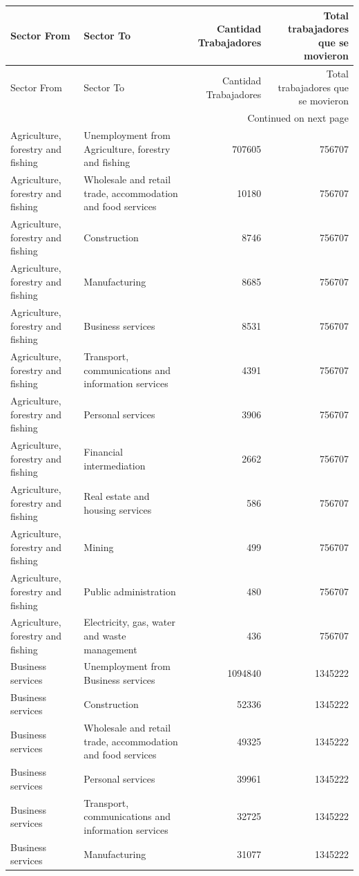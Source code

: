 \begin{longtable}{llrr}
\toprule
Sector From & Sector To & Cantidad Trabajadores & Total trabajadores que se movieron \\
\midrule
\endfirsthead
\toprule
Sector From & Sector To & Cantidad Trabajadores & Total trabajadores que se movieron \\
\midrule
\endhead
\midrule
\multicolumn{4}{r}{Continued on next page} \\
\midrule
\endfoot
\bottomrule
\endlastfoot
Agriculture, forestry and fishing & Unemployment from Agriculture, forestry and fishing & 707605 & 756707 \\
Agriculture, forestry and fishing & Wholesale and retail trade, accommodation and food services & 10180 & 756707 \\
Agriculture, forestry and fishing & Construction & 8746 & 756707 \\
Agriculture, forestry and fishing & Manufacturing & 8685 & 756707 \\
Agriculture, forestry and fishing & Business services & 8531 & 756707 \\
Agriculture, forestry and fishing & Transport, communications and information services & 4391 & 756707 \\
Agriculture, forestry and fishing & Personal services & 3906 & 756707 \\
Agriculture, forestry and fishing & Financial intermediation & 2662 & 756707 \\
Agriculture, forestry and fishing & Real estate and housing services & 586 & 756707 \\
Agriculture, forestry and fishing & Mining & 499 & 756707 \\
Agriculture, forestry and fishing & Public administration & 480 & 756707 \\
Agriculture, forestry and fishing & Electricity, gas, water and waste management & 436 & 756707 \\
Business services & Unemployment from Business services & 1094840 & 1345222 \\
Business services & Construction & 52336 & 1345222 \\
Business services & Wholesale and retail trade, accommodation and food services & 49325 & 1345222 \\
Business services & Personal services & 39961 & 1345222 \\
Business services & Transport, communications and information services & 32725 & 1345222 \\
Business services & Manufacturing & 31077 & 1345222 \\

\end{longtable}
